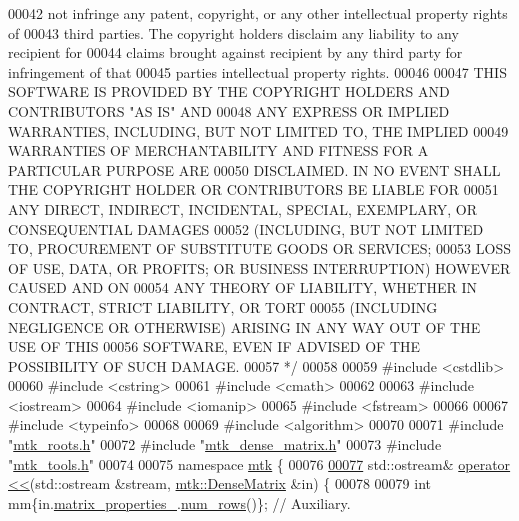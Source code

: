 \begin{DoxyCode}
00042 \textcolor{comment}{not infringe any patent, copyright, or any other intellectual property rights of}
00043 \textcolor{comment}{third parties. The copyright holders disclaim any liability to any recipient for}
00044 \textcolor{comment}{claims brought against recipient by any third party for infringement of that}
00045 \textcolor{comment}{parties intellectual property rights.}
00046 \textcolor{comment}{}
00047 \textcolor{comment}{THIS SOFTWARE IS PROVIDED BY THE COPYRIGHT HOLDERS AND CONTRIBUTORS "AS IS" AND}
00048 \textcolor{comment}{ANY EXPRESS OR IMPLIED WARRANTIES, INCLUDING, BUT NOT LIMITED TO, THE IMPLIED}
00049 \textcolor{comment}{WARRANTIES OF MERCHANTABILITY AND FITNESS FOR A PARTICULAR PURPOSE ARE}
00050 \textcolor{comment}{DISCLAIMED. IN NO EVENT SHALL THE COPYRIGHT HOLDER OR CONTRIBUTORS BE LIABLE FOR}
00051 \textcolor{comment}{ANY DIRECT, INDIRECT, INCIDENTAL, SPECIAL, EXEMPLARY, OR CONSEQUENTIAL DAMAGES}
00052 \textcolor{comment}{(INCLUDING, BUT NOT LIMITED TO, PROCUREMENT OF SUBSTITUTE GOODS OR SERVICES;}
00053 \textcolor{comment}{LOSS OF USE, DATA, OR PROFITS; OR BUSINESS INTERRUPTION) HOWEVER CAUSED AND ON}
00054 \textcolor{comment}{ANY THEORY OF LIABILITY, WHETHER IN CONTRACT, STRICT LIABILITY, OR TORT}
00055 \textcolor{comment}{(INCLUDING NEGLIGENCE OR OTHERWISE) ARISING IN ANY WAY OUT OF THE USE OF THIS}
00056 \textcolor{comment}{SOFTWARE, EVEN IF ADVISED OF THE POSSIBILITY OF SUCH DAMAGE.}
00057 \textcolor{comment}{*/}
00058 
00059 \textcolor{preprocessor}{#include <cstdlib>}
00060 \textcolor{preprocessor}{#include <cstring>}
00061 \textcolor{preprocessor}{#include <cmath>}
00062 
00063 \textcolor{preprocessor}{#include <iostream>}
00064 \textcolor{preprocessor}{#include <iomanip>}
00065 \textcolor{preprocessor}{#include <fstream>}
00066 
00067 \textcolor{preprocessor}{#include <typeinfo>}
00068 
00069 \textcolor{preprocessor}{#include <algorithm>}
00070 
00071 \textcolor{preprocessor}{#include "\hyperlink{mtk__roots_8h}{mtk\_roots.h}"}
00072 \textcolor{preprocessor}{#include "\hyperlink{mtk__dense__matrix_8h}{mtk\_dense\_matrix.h}"}
00073 \textcolor{preprocessor}{#include "\hyperlink{mtk__tools_8h}{mtk\_tools.h}"}
00074 
00075 \textcolor{keyword}{namespace }\hyperlink{namespacemtk}{mtk} \{
00076 
\hypertarget{mtk__dense__matrix_8cc_source_l00077}{}\hyperlink{namespacemtk_ad3bcf52cda59ddb5fc7b4bdce76c46dc}{00077} std::ostream& \hyperlink{namespacemtk_ad3bcf52cda59ddb5fc7b4bdce76c46dc}{operator <<}(std::ostream &stream, \hyperlink{classmtk_1_1DenseMatrix}{mtk::DenseMatrix} &in) \{
00078 
00079   \textcolor{keywordtype}{int} mm\{in.\hyperlink{classmtk_1_1DenseMatrix_a481c8d09af685a5ba67acefdcaa810cc}{matrix\_properties\_}.\hyperlink{classmtk_1_1Matrix_ab308b25b48e4fcd39fc60e0c3fc66dea}{num\_rows}()\};  \textcolor{comment}{// Auxiliary.}

\end{DoxyCode}
